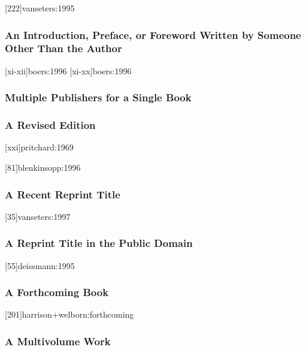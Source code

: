 \documentclass[a4paper]{article}
\begin{document}
[222]{vanseters:1995}

\subsubsection{An Introduction, Preface, or Foreword Written by Someone Other
Than the Author}

[xi-xii]{boers:1996}
[xi-xx]{boers:1996}

\subsubsection{Multiple Publishers for a Single Book}


\subsubsection{A Revised Edition}

[xxi]{pritchard:1969}

[81]{blenkinsopp:1996}

\subsubsection{A Recent Reprint Title}

[35]{vanseters:1997}

\subsubsection{A Reprint Title in the Public Domain}

[55]{deissmann:1995}

\subsubsection{A Forthcoming Book}

[201]{harrison+welborn:forthcoming}

\subsubsection{A Multivolume Work}
\end{document}
